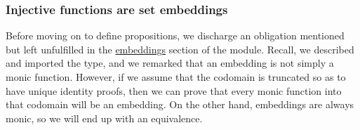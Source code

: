 \subsubsection{Injective functions are set embeddings}\label{injective-functions-are-set-embeddings}
Before moving on to define propositions, we discharge an obligation mentioned but left unfulfilled in the
\href{https://ualib.gitlab.io/Overture.Inverses.html\#embeddings}{embeddings} section of the  module. Recall, we described and imported the  type, and we remarked that an embedding is not simply a monic function. However, if we assume that the codomain is truncated so as to have unique identity proofs, then we can prove that every monic function into that codomain will be an embedding. On the other hand, embeddings are always monic, so we will end up with an equivalence.
\ccpad

